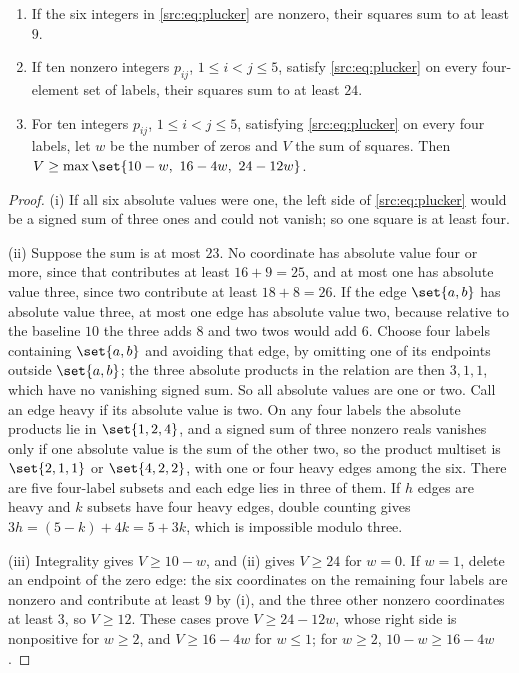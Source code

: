 \begin{lemma}\label{src:lem:plucker}
\begin{enumerate}[label=\textup{(\roman*)}]
\item If the six integers in \eqref{src:eq:plucker} are nonzero, their squares sum to at least
$9$.
\item If ten nonzero integers $p_{ij}$, $1\le i<j\le5$, satisfy \eqref{src:eq:plucker} on every
four-element set of labels, their squares sum to at least $24$.
\item For ten integers $p_{ij}$, $1\le i<j\le5$, satisfying \eqref{src:eq:plucker} on every
four labels, let $w$ be the number of zeros and $V$ the sum of squares. Then
$V\ge\max\set{10-w,\ 16-4w,\ 24-12w}$.
\end{enumerate}
\end{lemma}

\begin{proof}
(i) If all six absolute values were one, the left side of \eqref{src:eq:plucker} would be a
signed sum of three ones and could not vanish; so one square is at least four.

(ii) Suppose the sum is at most $23$. No coordinate has absolute value four or more, since
that contributes at least $16+9=25$, and at most one has absolute value three, since two
contribute at least $18+8=26$. If the edge $\set{a,b}$ has absolute value three, at most one
edge has absolute value two, because relative to the baseline $10$ the three adds $8$ and two
twos would add $6$. Choose four labels containing $\set{a,b}$ and avoiding that edge, by
omitting one of its endpoints outside $\set{a,b}$; the three absolute products in the relation
are then $3,1,1$, which have no vanishing signed sum. So all absolute values are one or two.
Call an edge heavy if its absolute value is two. On any four labels the absolute products lie
in $\set{1,2,4}$, and a signed sum of three nonzero reals vanishes only if one absolute value is
the sum of the other two, so the product multiset is $\set{2,1,1}$ or $\set{4,2,2}$, with one or
four heavy edges among the six. There are five four-label subsets and each edge lies in three of
them. If $h$ edges are heavy and $k$ subsets have four heavy edges, double counting gives
$3h=(5-k)+4k=5+3k$, which is impossible modulo three.

(iii) Integrality gives $V\ge10-w$, and (ii) gives $V\ge24$ for $w=0$. If $w=1$, delete an
endpoint of the zero edge: the six coordinates on the remaining four labels are nonzero and
contribute at least $9$ by (i), and the three other nonzero coordinates at least $3$, so
$V\ge12$. These cases prove $V\ge24-12w$, whose right side is nonpositive for $w\ge2$, and
$V\ge16-4w$ for $w\le1$; for $w\ge2$, $10-w\ge16-4w$.
\end{proof}

